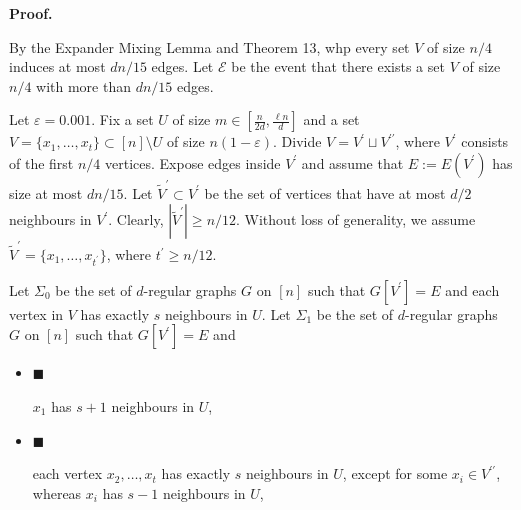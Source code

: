 \documentclass[10pt,a4paper]{article}
\begin{document}




\par\medskip\noindent\textbf{Proof.}\par




By the Expander Mixing Lemma and Theorem 13, whp every set $V$ of size $n/4$ induces at most $dn/15$ edges. Let $\mathcal{E}$ be the event that there exists a set $V$ of size $n/4$ with more than $dn/15$ edges.\par




Let $\varepsilon=0.001$. Fix a set $U$ of size $m\in[\frac{n}{2d},\frac{\ell n}{d}]$ and a set $V=\{x_{1},\ldots,x_{t}\}\subset[n]\setminus U$ of size $n(1-\varepsilon)$. Divide $V=V^{\prime}\sqcup V^{\prime\prime}$, where $V^{\prime}$ consists of the first $n/4$ vertices. Expose edges inside $V^{\prime}$ and assume that $E:=E(V^{\prime})$ has size at most $dn/15$. Let $\tilde{V}^{\prime}\subset V^{\prime}$ be the set of vertices that have at most $d/2$ neighbours in $V^{\prime}$. Clearly, $|\tilde{V}^{\prime}|\geq n/12$. Without loss of generality, we assume $\tilde{V}^{\prime}=\{x_{1},\ldots,x_{t^{\prime}}\}$, where $t^{\prime}\geq n/12$.\par




Let $\Sigma_{0}$ be the set of $d$-regular graphs $G$ on $[n]$ such that $G[V^{\prime}]=E$ and each vertex in $V$ has exactly $s$ neighbours in $U$.
Let $\Sigma_{1}$ be the set of $d$-regular graphs $G$ on $[n]$ such that $G[V^{\prime}]=E$ and\par


\begin{itemize}


\item[] 
$\blacksquare$ 


$x_{1}$ has $s+1$ neighbours in $U$,\par





\item[] 
$\blacksquare$ 


each vertex $x_{2},\ldots,x_{t}$ has exactly $s$ neighbours in $U$, except for some $x_{i}\in V^{\prime\prime}$, whereas $x_{i}$ has $s-1$ neighbours in $U$,\par





\end{itemize}
\end{document}

